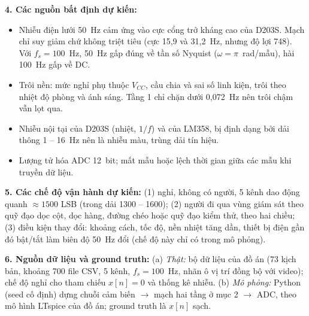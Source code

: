 \documentclass[a4paper,10pt]{article}
\newcommand{\muc}[1]{\par\smallskip\textbf{#1}\enspace}
\begin{document}
\muc{4. Các nguồn bất định dự kiến:}
\begin{itemize}
  \item Nhiễu điện lưới 50~Hz cảm ứng vào cực cổng trở kháng cao của D203S. Mạch chỉ suy giảm chứ không triệt tiêu
        (cực 15,9 và 31,2~Hz, nhưng độ lợi 748). Với $f_s = 100$~Hz, 50~Hz gấp đúng về tần số Nyquist ($\omega = \pi$~rad/mẫu), hài 100~Hz gấp về DC.
  \item Trôi nền: mức nghỉ phụ thuộc $V_{CC}$, cầu chia và sai số linh kiện, trôi theo nhiệt độ phòng và ánh sáng. Tầng 1 chỉ chặn dưới 0,072~Hz nên trôi chậm vẫn lọt qua.
  \item Nhiễu nội tại của D203S (nhiệt, $1/f$) và của LM358, bị định dạng bởi dải thông 1 -- 16~Hz nên là nhiễu màu, trùng dải tín hiệu.
  \item Lượng tử hóa ADC 12~bit; mất mẫu hoặc lệch thời gian giữa các mẫu khi truyền dữ liệu.
\end{itemize}

\muc{5. Các chế độ vận hành dự kiến:} (1) nghỉ, không có người, 5 kênh dao động quanh $\approx 1500$ LSB (trong dải 1300 -- 1600);
(2) người đi qua vùng giám sát theo quỹ đạo dọc cột, dọc hàng, đường chéo hoặc quỹ đạo kiểm thử, theo hai chiều;
(3) điều kiện thay đổi: khoảng cách, tốc độ, nền nhiệt tăng dần, thiết bị điện gần đó bật/tắt làm biên độ 50~Hz đổi (chế độ này chỉ có trong mô phỏng).

\muc{6. Nguồn dữ liệu và ground truth:} (a) \emph{Thật:} bộ dữ liệu của đồ án (73 kịch bản, khoảng 700 file CSV, 5 kênh, $f_s = 100$~Hz,
nhãn ô vị trí đồng bộ với video); chế độ nghỉ cho tham chiếu $x[n] = 0$ và thống kê nhiễu. (b) \emph{Mô phỏng:} Python (seed cố định) dựng chuỗi
cảm biến $\to$ mạch hai tầng ở mục 2 $\to$ ADC, theo mô hình LTspice của đồ án; ground truth là $x[n]$ sạch.
\end{document}
